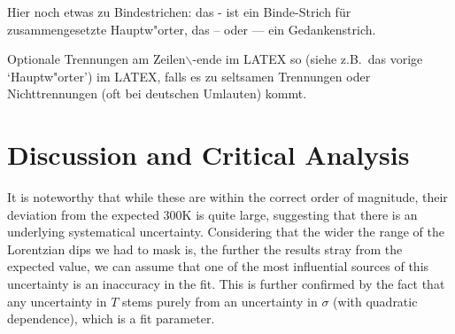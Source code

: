 \documentclass[12pt, a4paper]{article}
\begin{document}
Hier noch etwas zu Bindestrichen: das - ist ein Binde-Strich f\"ur 
zusammengesetzte Haupt\-w"or\-ter, das -- oder --- ein Gedankenstrich. 

Optionale
Trennungen am Zeilen$\backslash$-ende im LATEX so (siehe z.B.\ das vorige 
`Haupt\-w"or\-ter') im LATEX, falls es zu seltsamen
Trennungen oder Nichttrennungen (oft bei deutschen Umlauten) kommt.


















\newpage

\section{Discussion and Critical Analysis}

It is noteworthy that while these are within the correct order of magnitude, their deviation from the expected $300\si{\kelvin}$ is quite large, suggesting that there is an underlying systematical uncertainty. Considering that the wider the range of the Lorentzian dips we had to mask is, the further the results stray from the expected value, we can assume that one of the most influential sources of this uncertainty is an inaccuracy in the fit. This is further confirmed by the fact that any uncertainty in $T$ stems purely from an uncertainty in $\sigma$ (with quadratic dependence), which is a fit parameter.



\newpage
\end{document}
